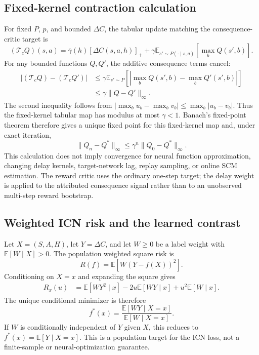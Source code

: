 \documentclass[10pt]{article}
\newcommand{\E}{\mathbb{E}}
\begin{document}
\subsection{Fixed-kernel contraction calculation}
For fixed $P$, $p$, and bounded $\Delta C$, the tabular update matching the
consequence-critic target is
\begin{equation}
(\mathcal{T}_cQ)(s,a)=\bar\gamma(h)[\Delta C(s,a,h)]_+
 +\gamma\E_{s'\sim P(\cdot\mid s,a)}[\max_bQ(s',b)].
\end{equation}
For any bounded functions $Q,Q'$, the additive consequence terms cancel:
\begin{align}
\left|(\mathcal{T}_cQ)-(\mathcal{T}_cQ')\right|
&\le\gamma\E_{s'\sim P}\left[
\left|\max_bQ(s',b)-\max_bQ'(s',b)\right|\right]\\
&\le\gamma\|Q-Q'\|_\infty.
\end{align}
The second inequality follows from
$|\max_bu_b-\max_bv_b|\le\max_b|u_b-v_b|$. Thus the fixed-kernel tabular
map has modulus at most $\gamma<1$. Banach's fixed-point theorem therefore
gives a unique fixed point for this fixed-kernel map and, under exact
iteration,
\begin{equation}
\|Q_n-Q^*\|_\infty\le\gamma^n\|Q_0-Q^*\|_\infty.
\end{equation}
This calculation does not imply convergence for neural function
approximation, changing delay kernels, target-network lag, replay sampling,
or online SCM estimation. The reward critic uses the ordinary one-step target;
the delay weight is applied to the attributed consequence signal rather than
to an unobserved multi-step reward bootstrap.

\subsection{Weighted ICN risk and the learned contrast}
Let $X=(S,A,H)$, let $Y=\Delta C$, and let $W\ge0$ be a label weight with
$\E[W\mid X]>0$. The population weighted square risk is
\begin{equation}
R(f)=\E\left[W(Y-f(X))^2\right].
\end{equation}
Conditioning on $X=x$ and expanding the square gives
\begin{align}
R_x(u)&=\E[WY^2\mid x]-2u\E[WY\mid x]+u^2\E[W\mid x].
\end{align}
The unique conditional minimizer is therefore
\begin{equation}
f^*(x)=\frac{\E[WY\mid X=x]}{\E[W\mid X=x]}.
\end{equation}
If $W$ is conditionally independent of $Y$ given $X$, this reduces to
$f^*(x)=\E[Y\mid X=x]$. This is a population target for the ICN loss, not a
finite-sample or neural-optimization guarantee.
\end{document}
